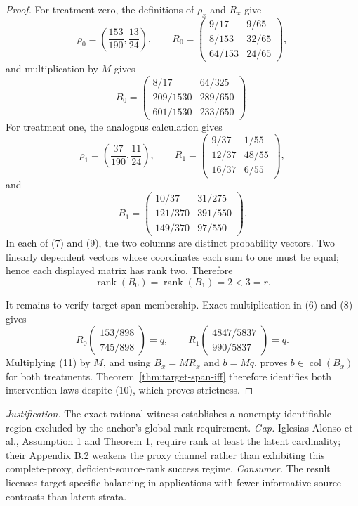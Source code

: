 \documentclass{article}
\begin{document}
\begin{proof}
For treatment zero, the definitions of \(\rho_x\) and \(R_x\) give
\[
\rho_0=\left(\frac{153}{190},\frac{13}{24}\right),\qquad
R_0=
\begin{pmatrix}
9/17&9/65\\
8/153&32/65\\
64/153&24/65
\end{pmatrix},
\tag{6}
\]
and multiplication by \(M\) gives
\[
B_0=
\begin{pmatrix}
8/17&64/325\\
209/1530&289/650\\
601/1530&233/650
\end{pmatrix}.
\tag{7}
\]
For treatment one, the analogous calculation gives
\[
\rho_1=\left(\frac{37}{190},\frac{11}{24}\right),\qquad
R_1=
\begin{pmatrix}
9/37&1/55\\
12/37&48/55\\
16/37&6/55
\end{pmatrix},
\tag{8}
\]
and
\[
B_1=
\begin{pmatrix}
10/37&31/275\\
121/370&391/550\\
149/370&97/550
\end{pmatrix}.
\tag{9}
\]
In each of (7) and (9), the two columns are distinct probability vectors. Two linearly dependent vectors whose coordinates each sum to one must be equal; hence each displayed matrix has rank two. Therefore
\[
\operatorname{rank}(B_0)=\operatorname{rank}(B_1)=2<3=r.
\tag{10}
\]

It remains to verify target-span membership. Exact multiplication in (6) and (8) gives
\[
R_0
\begin{pmatrix}153/898\\745/898\end{pmatrix}
=q,
\qquad
R_1
\begin{pmatrix}4847/5837\\990/5837\end{pmatrix}
=q.
\tag{11}
\]
Multiplying (11) by \(M\), and using \(B_x=MR_x\) and \(b=Mq\), proves \(b\in\operatorname{col}(B_x)\) for both treatments. Theorem~\ref{thm:target-span-iff} therefore identifies both intervention laws despite (10), which proves strictness.
\end{proof}
\par\smallskip\noindent \textit{Justification.} The exact rational witness establishes a nonempty identifiable region excluded by the anchor's global rank requirement. \textit{Gap.} Iglesias-Alonso et al., Assumption 1 and Theorem 1, require rank at least the latent cardinality; their Appendix B.2 weakens the proxy channel rather than exhibiting this complete-proxy, deficient-source-rank success regime. \textit{Consumer.} The result licenses target-specific balancing in applications with fewer informative source contrasts than latent strata.
\end{document}
